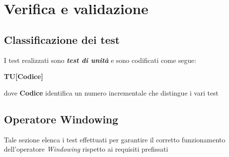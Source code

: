 
\chapter{Verifica e validazione}
\label{cap:verifica-validazione}



\section{Classificazione dei test}
I test realizzati sono \textbf{\textit{test di unità}} e sono codificati come segue:
\begin{center}
\textbf{TU[Codice]}\\
\end{center}
dove \textbf{Codice} identifica un numero incrementale che distingue i vari test

\section{Operatore Windowing}
Tale sezione elenca i test effettuati per garantire il corretto funzionamento dell'operatore \textit{Windowing} rispetto ai requisiti prefissati

